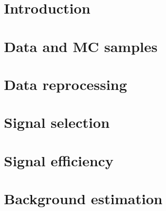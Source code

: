 \documentclass[NOTE, english, texlive=2017]{\ATLASLATEXPATH atlasdoc}
\begin{document}
\maketitle

\tableofcontents


\section{Introduction}
\label{sec:intro}


\section{Data and MC samples}
\label{sec:data_MC}


\section{Data reprocessing}
\label{sec:data_preparation}


\section{Signal selection}
\label{sec:signal_selection}


\section{Signal efficiency}
\label{sec:signal_efficiency}


\section{Background estimation}
\label{sec:background_estimation}

\end{document}
